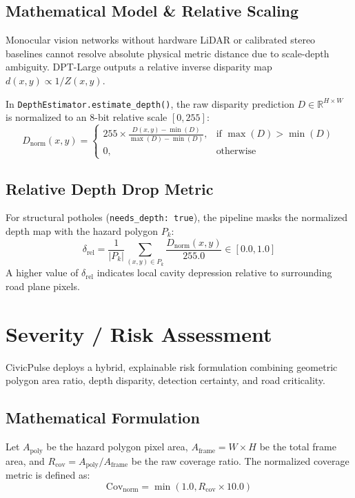 \documentclass[11pt,a4paper]{article}
\begin{document}
\subsection{Mathematical Model \& Relative Scaling}
Monocular vision networks without hardware LiDAR or calibrated stereo baselines cannot resolve absolute physical metric distance due to scale-depth ambiguity. DPT-Large outputs a relative inverse disparity map $d(x, y) \propto 1 / Z(x, y)$. 

In \texttt{DepthEstimator.estimate\_depth()}, the raw disparity prediction $D \in \mathbb{R}^{H \times W}$ is normalized to an 8-bit relative scale $[0, 255]$:
\begin{equation}
D_{\text{norm}}(x, y) = \begin{cases}
255 \times \frac{D(x, y) - \min(D)}{\max(D) - \min(D)}, & \text{if } \max(D) > \min(D) \\
0, & \text{otherwise}
\end{cases}
\end{equation}

\subsection{Relative Depth Drop Metric}
For structural potholes (\texttt{needs\_depth: true}), the pipeline masks the normalized depth map with the hazard polygon $P_k$:
\begin{equation}
\delta_{\text{rel}} = \frac{1}{|P_k|} \sum_{(x,y) \in P_k} \frac{D_{\text{norm}}(x, y)}{255.0} \in [0.0, 1.0]
\end{equation}
A higher value of $\delta_{\text{rel}}$ indicates local cavity depression relative to surrounding road plane pixels.

\section{Severity / Risk Assessment}
CivicPulse deploys a hybrid, explainable risk formulation combining geometric polygon area ratio, depth disparity, detection certainty, and road criticality.

\subsection{Mathematical Formulation}
Let $A_{\text{poly}}$ be the hazard polygon pixel area, $A_{\text{frame}} = W \times H$ be the total frame area, and $R_{\text{cov}} = A_{\text{poly}} / A_{\text{frame}}$ be the raw coverage ratio. The normalized coverage metric is defined as:
\begin{equation}
\text{Cov}_{\text{norm}} = \min\left(1.0, R_{\text{cov}} \times 10.0\right)
\end{equation}
\end{document}
